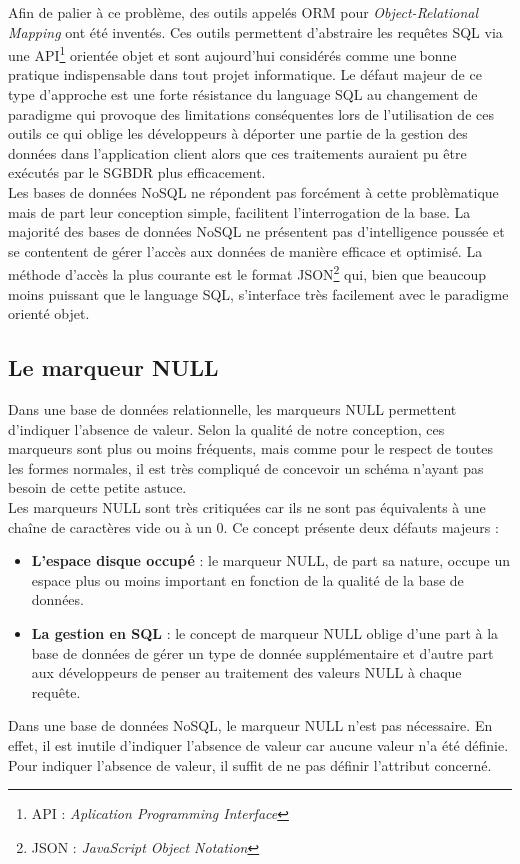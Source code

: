   Afin de palier à ce problème, des outils appelés ORM pour \textit{Object-Relational Mapping} ont été inventés. Ces outils permettent d'abstraire les requêtes SQL via une API\footnote{API : \textit{Aplication Programming Interface}} orientée objet et sont aujourd'hui considérés comme une bonne pratique indispensable dans tout projet informatique. Le défaut majeur de ce type d'approche est une forte résistance du language SQL au changement de paradigme qui provoque des limitations conséquentes lors de l'utilisation de ces outils ce qui oblige les développeurs à déporter une partie de la gestion des données dans l'application client alors que ces traitements auraient pu être exécutés par le SGBDR plus efficacement.\\

  Les bases de données NoSQL ne répondent pas forcément à cette problèmatique mais de part leur conception simple, facilitent l'interrogation de la base. La majorité des bases de données NoSQL ne présentent pas d'intelligence poussée et se contentent de gérer l'accès aux données de manière efficace et optimisé. La méthode d'accès la plus courante est le format JSON\footnote{JSON : \textit{JavaScript Object Notation}} qui, bien que beaucoup moins puissant que le language SQL, s'interface très facilement avec le paradigme orienté objet.


\subsection{Le marqueur NULL}
  Dans une base de données relationnelle, les marqueurs  NULL permettent d'indiquer l'absence de valeur. Selon la qualité de notre conception, ces marqueurs sont plus ou moins fréquents, mais comme pour le respect de toutes les formes normales, il est très compliqué de concevoir un schéma n'ayant pas besoin de cette petite astuce.\\

  Les marqueurs NULL sont très critiquées car ils ne sont pas équivalents à une chaîne de caractères vide ou à un 0. Ce concept présente deux défauts majeurs :
  \vspace{10px}
  \begin{itemize}
    \item \textbf{L'espace disque occupé} : le marqueur NULL, de part sa nature, occupe un espace plus ou moins important en fonction de la qualité de la base de données.
    \item \textbf{La gestion en SQL} : le concept de marqueur NULL oblige d'une part à la base de données de gérer un type de donnée supplémentaire et d'autre part aux développeurs de penser au traitement des valeurs NULL à chaque requête.
  \end{itemize}
  \vspace{20px}

  Dans une base de données NoSQL, le marqueur NULL n'est pas nécessaire. En effet, il est inutile d'indiquer l'absence de valeur car aucune valeur n'a été définie. Pour indiquer l'absence de valeur, il suffit de ne pas définir l'attribut concerné.
